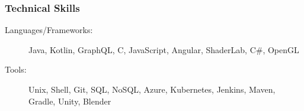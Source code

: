 \documentclass{article}
\begin{document}
\subsubsection*{Technical Skills}
    \begin{description}    
        \item[Languages/Frameworks:] 
            Java, 
            Kotlin,
            GraphQL,
            C,
            JavaScript,
            Angular,
            ShaderLab, 
            C\#,
            OpenGL

            \vspace{0.5em}

        \item[Tools:] 
            Unix,
            Shell,
            Git,
            SQL,
            NoSQL,
            Azure,
            Kubernetes,
            Jenkins,
            Maven,
            Gradle,
            Unity,
            Blender
    \end{description}
\end{document}
